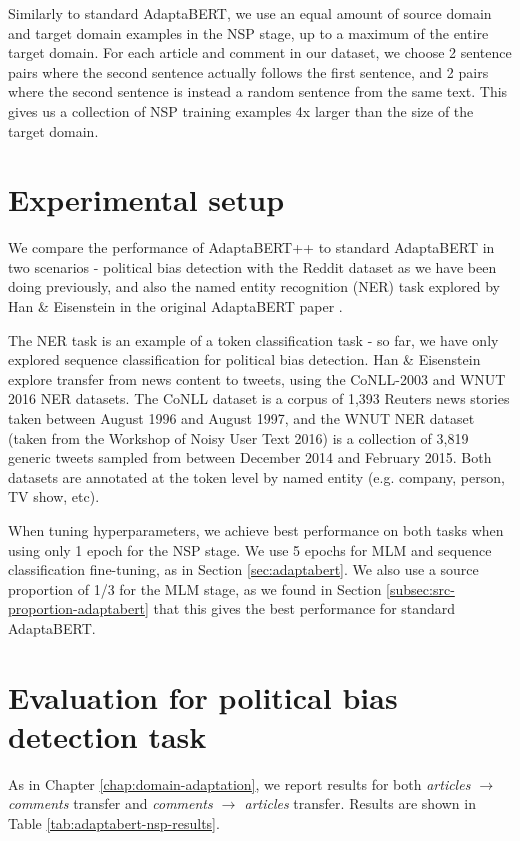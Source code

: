 Similarly to standard AdaptaBERT, we use an equal amount of source domain and target domain examples in the NSP stage, up to a maximum of the entire target domain. For each article and comment in our dataset, we choose 2 sentence pairs where the second sentence actually follows the first sentence, and 2 pairs where the second sentence is instead a random sentence from the same text. This gives us a collection of NSP training examples 4x larger than the size of the target domain.

\section{Experimental setup}

We compare the performance of AdaptaBERT++ to standard AdaptaBERT in two scenarios - political bias detection with the Reddit dataset as we have been doing previously, and also the named entity recognition (NER) task explored by Han \& Eisenstein in the original AdaptaBERT paper \cite{adaptabert}.

The NER task is an example of a token classification task - so far, we have only explored sequence classification for political bias detection. Han \& Eisenstein explore transfer from news content to tweets, using the CoNLL-2003 and WNUT 2016 NER datasets. The CoNLL dataset \cite{conll} is a corpus of 1,393 Reuters news stories \cite{reuters} taken between August 1996 and August 1997, and the WNUT NER dataset \cite{wnut} (taken from the Workshop of Noisy User Text 2016) is a collection of 3,819 generic tweets sampled from between December 2014 and February 2015. Both datasets are annotated at the token level by named entity (e.g. company, person, TV show, etc).

When tuning hyperparameters, we achieve best performance on both tasks when using only 1 epoch for the NSP stage. We use 5 epochs for MLM and sequence classification fine-tuning, as in Section \ref{sec:adaptabert}. We also use a source proportion of 1/3 for the MLM stage, as we found in Section \ref{subsec:src-proportion-adaptabert} that this gives the best performance for standard AdaptaBERT.

\section{Evaluation for political bias detection task} \label{sec:nsp-evaluation-political-bias}

As in Chapter \ref{chap:domain-adaptation}, we report results for both \textit{articles $ \rightarrow $ comments} transfer and \textit{comments $ \rightarrow $ articles} transfer. Results are shown in Table \ref{tab:adaptabert-nsp-results}.

